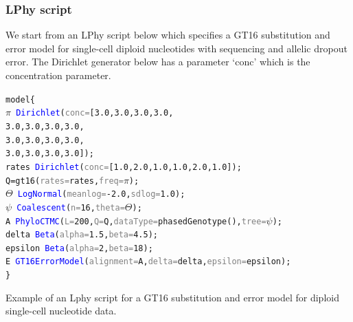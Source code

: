 \documentclass[10pt,letterpaper,table]{article}
\begin{document}
\subsubsection*{LPhy script}
We start from an LPhy script below which specifies a GT16 substitution and error model \cite{kozlov2022cellphy} for single-cell diploid nucleotides with sequencing and allelic dropout error.
The Dirichlet generator below has a parameter `conc' which is the concentration parameter. 

\begin{listing}
\small
\begin{alltt}
model \{
  \textcolor{bluishgreen}{\(\pi\)}  ~ \textcolor{blue}{Dirichlet}(\textcolor{gray}{conc=}[\textcolor{constant}{3.0}, \textcolor{constant}{3.0}, \textcolor{constant}{3.0}, \textcolor{constant}{3.0},
  \quad \quad \quad \quad \quad \quad \quad \textcolor{constant}{3.0}, \textcolor{constant}{3.0}, \textcolor{constant}{3.0}, \textcolor{constant}{3.0}, 
  \quad \quad \quad \quad \quad \quad \quad \textcolor{constant}{3.0}, \textcolor{constant}{3.0}, \textcolor{constant}{3.0}, \textcolor{constant}{3.0}, 
  \quad \quad \quad \quad \quad \quad \quad \textcolor{constant}{3.0}, \textcolor{constant}{3.0}, \textcolor{constant}{3.0}, \textcolor{constant}{3.0}]);
  \textcolor{bluishgreen}{rates} ~ \textcolor{blue}{Dirichlet}(\textcolor{gray}{conc=}[\textcolor{constant}{1.0}, \textcolor{constant}{2.0}, \textcolor{constant}{1.0}, \textcolor{constant}{1.0}, \textcolor{constant}{2.0}, \textcolor{constant}{1.0}]);
  Q = \textcolor{generator}{gt16}(\textcolor{gray}{rates=}\textcolor{bluishgreen}{rates}, \textcolor{gray}{freq=}\textcolor{bluishgreen}{\(\pi\)});
  \textcolor{bluishgreen}{\(\Theta\)} ~ \textcolor{blue}{LogNormal}(\textcolor{gray}{meanlog=}\textcolor{constant}{-2.0}, \textcolor{gray}{sdlog=}\textcolor{constant}{1.0});
  \textcolor{bluishgreen}{\(\psi\)} ~ \textcolor{blue}{Coalescent}(\textcolor{gray}{n=}\textcolor{constant}{16}, \textcolor{gray}{theta=}\textcolor{bluishgreen}{\(\Theta\)});
  \textcolor{bluishgreen}{A} ~ \textcolor{blue}{PhyloCTMC}(\textcolor{gray}{L=}\textcolor{constant}{200}, \textcolor{gray}{Q=}Q, \textcolor{gray}{dataType=}\textcolor{generator}{phasedGenotype}(), \textcolor{gray}{tree=}\textcolor{bluishgreen}{\(\psi\)});
  \textcolor{bluishgreen}{delta} ~ \textcolor{blue}{Beta}(\textcolor{gray}{alpha=}\textcolor{constant}{1.5}, \textcolor{gray}{beta=}\textcolor{constant}{4.5});
  \textcolor{bluishgreen}{epsilon} ~ \textcolor{blue}{Beta}(\textcolor{gray}{alpha=}\textcolor{constant}{2}, \textcolor{gray}{beta=}\textcolor{constant}{18});
  \textcolor{bluishgreen}{E} ~ \textcolor{blue}{GT16ErrorModel}(\textcolor{gray}{alignment=}\textcolor{bluishgreen}{A}, \textcolor{gray}{delta=}\textcolor{bluishgreen}{delta}, \textcolor{gray}{epsilon=}\textcolor{bluishgreen}{epsilon});
\}
\end{alltt}
\caption{Example of an Lphy script for a GT16 substitution and error model for diploid single-cell nucleotide data.}
\end{listing}
\end{document}
